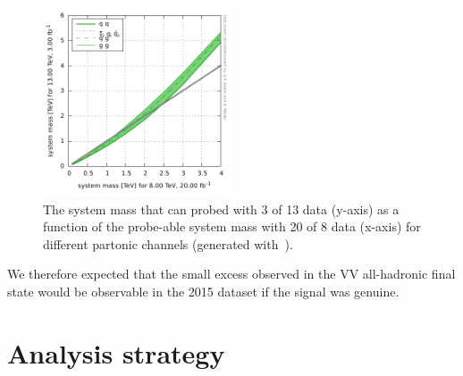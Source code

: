 \begin{figure}[h!] 
    \centering
    \includegraphics[width=0.50\textwidth]{figures/analysis/search1/misc/colliderReach.png}
    \caption{The system mass that can probed with 3 \fbinv of 13 \TeV data (y-axis) as a function of the probe-able system mass with 20 \fbinv of 8 \TeV data (x-axis) for different partonic channels (generated with~\cite{collreach}).}
    \label{fig:searchI:8vs13reach}
\end{figure}
We therefore expected that the small excess observed in the VV all-hadronic final state would be observable in the 2015 dataset if the signal was genuine.

\section{Analysis strategy}

